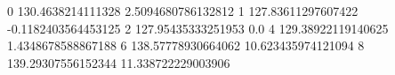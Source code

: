0 130.4638214111328 2.5094680786132812
1 127.83611297607422 -0.1182403564453125
2 127.95435333251953 0.0
4 129.38922119140625 1.4348678588867188
6 138.57778930664062 10.623435974121094
8 139.29307556152344 11.338722229003906
